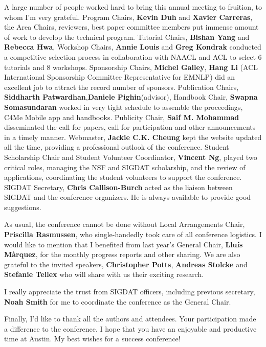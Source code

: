 A large number of people worked hard to bring this annual meeting to fruition, to whom I'm very grateful. Program Chairs, {\bf Kevin Duh} and {\bf Xavier Carreras}, the Area Chairs, reviewers, best paper committee members put immense amount of work to develop the technical program. Tutorial Chairs, {\bf Bishan Yang} and {\bf Rebecca Hwa}, Workshop Chairs, {\bf Annie Louis} and {\bf Greg Kondrak} conducted a competitive selection process in collaboration with NAACL and ACL to select 6 tutorials and 8 workshops. Sponsorship Chairs, {\bf Michel Galley}, {\bf Hang Li} (ACL International Sponsorship Committee Representative for EMNLP) did an excellent job to attract the record number of sponsors. Publication Chairs, {\bf Siddharth Patwardhan},{\bf Daniele Pighin}(advisor), Handbook Chair, {\bf Swapna Somasundaran} worked in very tight schedule to assemble the proceedings, C4Me Mobile app and handbooks. Publicity Chair, {\bf Saif M. Mohammad} disseminated the call for papers, call for participation and other announcements in a timely manner. Webmaster, {\bf Jackie C.K. Cheung} kept the website updated all the time, providing a professional outlook of the conference. Student Scholarship Chair and Student Volunteer Coordinator, {\bf Vincent Ng}, played two critical roles, managing the NSF and SIGDAT scholarship, and the review of applications, coordinating the student volunteers to support the conference. SIGDAT Secretary, {\bf Chris Callison-Burch} acted as the liaison between SIGDAT and the conference organizers. He is always available to provide good suggestions. 

As usual, the conference cannot be done without Local Arrangements Chair, {\bf Priscilla Rasmussen}, who single-handedly took care of all conference logistics. I would like to mention that I benefited from last year's General Chair, {\bf Lluís Màrquez}, for the monthly progress reports and other sharing.  We are also grateful to the invited speakers, {\bf Christopher Potts}, {\bf Andreas Stolcke} and {\bf Stefanie Tellex} who will share with us their exciting research.

I really appreciate the trust from SIGDAT officers, including previous secretary, {\bf Noah Smith} for me to coordinate the conference as the General Chair. 

Finally, I'd like to thank all the authors and attendees. Your participation made a difference to the conference. I hope that you have an enjoyable and productive time at Austin. My best wishes for a success conference!  


